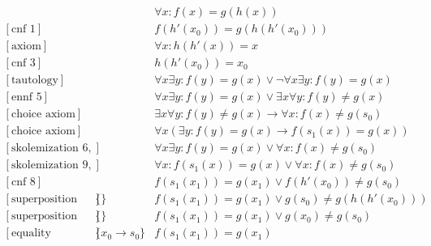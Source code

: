 \documentclass[onehalfspacing]{article}
\begin{document}
\setcounter{equation}{0}
\begin{align}
	[\text{axiom}]&&\forall x: f(x) = g(h(x))\\
	[\text{cnf 1}]&&f(h'(x_0)) = g(h(h'(x_0)))\\
	[\text{axiom}]&&\forall x: h(h'(x)) = x\\
	[\text{cnf 3}]&&h(h'(x_0)) = x_0\\
	[\text{tautology}]&&\forall x\exists y: f(y) = g(x)\vee\neg\forall x\exists y: f(y) = g(x)\\
	[\text{ennf 5}]&&\forall x\exists y: f(y) = g(x)\vee\exists x\forall y: f(y)\neq g(x)\\
	[\text{choice axiom}]&&\exists x\forall y: f(y)\neq g(x)\rightarrow \forall x : f(x) \neq g(s_0)\\
	[\text{choice axiom}]&&\forall x(\exists y: f(y)= g(x)\rightarrow f(s_1(x)) = g(x))\\
	[\text{skolemization 6, 7}]&&\forall x\exists y: f(y) = g(x)\vee\forall x: f(x)\neq g(s_0)\\
	[\text{skolemization 9, 8}]&&\forall x: f(s_1(x)) = g(x)\vee\forall x: f(x)\neq g(s_0)\\
	[\text{cnf 8}]&&f(s_1(x_1)) = g(x_1)\vee f(h'(x_0))\neq g(s_0)\\
	[\text{superposition 11, 2}]&\{\}&f(s_1(x_1)) = g(x_1)\vee g(s_0)\neq g(h(h'(x_0)))\\
	[\text{superposition 12, 4}]&\{\}&f(s_1(x_1)) = g(x_1)\vee g(x_0)\neq g(s_0)\\
	[\text{equality resolution 13}]&\{x_0\to s_0\}&f(s_1(x_1)) = g(x_1)
\end{align}
\end{document}
